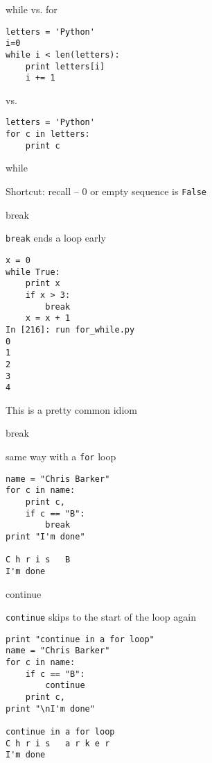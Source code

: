 \documentclass{beamer}
\begin{document}
\begin{frame}[fragile]{while vs. for}

\begin{verbatim}
letters = 'Python'
i=0
while i < len(letters):
    print letters[i]
    i += 1
\end{verbatim}
vs.
\begin{verbatim}
letters = 'Python'
for c in letters:
    print c
\end{verbatim}

\end{frame}


\begin{frame}[fragile]{while}

{\Large Shortcut: recall -- 0 or empty sequence is \verb|False| }


\end{frame}


\begin{frame}[fragile]{break}

{\Large \verb|break| ends a loop early}

\begin{verbatim}
x = 0
while True:
    print x
    if x > 3:
        break
    x = x + 1
In [216]: run for_while.py
0
1
2
3
4
\end{verbatim}

This is a pretty common idiom

\end{frame}

\begin{frame}[fragile]{break}

{\Large same way with a \verb|for| loop }

\begin{verbatim}
name = "Chris Barker"
for c in name:
    print c,
    if c == "B":
        break
print "I'm done"

C h r i s   B 
I'm done
\end{verbatim}
\end{frame}

\begin{frame}[fragile]{continue}

{\Large \verb|continue| skips to the start of the loop again}

\begin{verbatim}
print "continue in a for loop"
name = "Chris Barker"
for c in name:
    if c == "B":
        continue
    print c,
print "\nI'm done"

continue in a for loop
C h r i s   a r k e r 
I'm done
\end{verbatim}
\end{frame}
\end{document}
